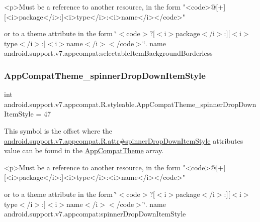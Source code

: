 \begin{DoxyVerb}      <p>Must be a reference to another resource, in the form "<code>@[+][<i>package</i>:]<i>type</i>:<i>name</i></code>"
\end{DoxyVerb}
 or to a theme attribute in the form \char`\"{}$<$code$>$?\mbox{[}$<$i$>$package$<$/i$>$\+:\mbox{]}\mbox{[}$<$i$>$type$<$/i$>$\+:\mbox{]}$<$i$>$name$<$/i$>$$<$/code$>$\char`\"{}.  name android.\+support.\+v7.\+appcompat\+:selectable\+Item\+Background\+Borderless \mbox{\label{classandroid_1_1support_1_1v7_1_1appcompat_1_1R_1_1styleable_abcc5a46cb6b46deb459f96b4b614a633}} 
\subsubsection{\texorpdfstring{App\+Compat\+Theme\+\_\+spinner\+Drop\+Down\+Item\+Style}{AppCompatTheme\_spinnerDropDownItemStyle}}
{\footnotesize\ttfamily int android.\+support.\+v7.\+appcompat.\+R.\+styleable.\+App\+Compat\+Theme\+\_\+spinner\+Drop\+Down\+Item\+Style = 47\hspace{0.3cm}{\ttfamily [static]}}

This symbol is the offset where the \hyperlink{classandroid_1_1support_1_1v7_1_1appcompat_1_1R_1_1attr_a07e24b4eab5f4981771950f48a1ebcf0}{android.\+support.\+v7.\+appcompat.\+R.\+attr\#spinner\+Drop\+Down\+Item\+Style} attribute\textquotesingle{}s value can be found in the \hyperlink{classandroid_1_1support_1_1v7_1_1appcompat_1_1R_1_1styleable_a5c42f89e8a410c323be34208d75c430b}{App\+Compat\+Theme} array.

\begin{DoxyVerb}      <p>Must be a reference to another resource, in the form "<code>@[+][<i>package</i>:]<i>type</i>:<i>name</i></code>"
\end{DoxyVerb}
 or to a theme attribute in the form \char`\"{}$<$code$>$?\mbox{[}$<$i$>$package$<$/i$>$\+:\mbox{]}\mbox{[}$<$i$>$type$<$/i$>$\+:\mbox{]}$<$i$>$name$<$/i$>$$<$/code$>$\char`\"{}.  name android.\+support.\+v7.\+appcompat\+:spinner\+Drop\+Down\+Item\+Style \mbox{\label{classandroid_1_1support_1_1v7_1_1appcompat_1_1R_1_1styleable_a479f2661585bab71f0ceb0c86482f40d}} 
